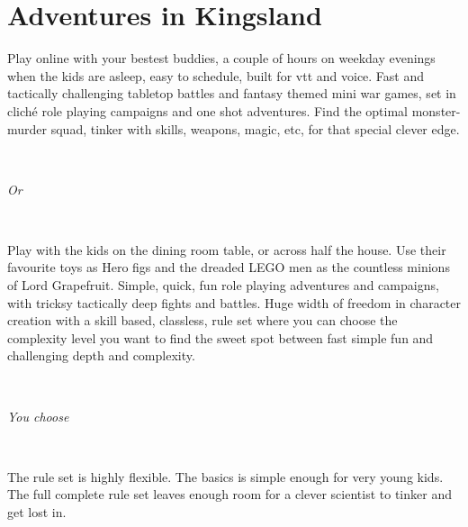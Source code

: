 \cleardoublepage
\pagestyle{fancy}
\flushbottom






\section*{Adventures in Kingsland}

\noindent
Play online with your bestest buddies, a couple of hours on weekday evenings when the kids are asleep, easy to schedule, built for vtt and voice.
Fast and tactically challenging tabletop battles and fantasy themed mini war games, set in cliché role playing campaigns and one shot adventures. 
Find the optimal monster-murder squad, tinker with skills, weapons, magic, etc, for that special clever edge.

\

\emph{Or}

\

\noindent
Play with the kids on the dining room table, or across half the house. Use their favourite toys as Hero figs and the dreaded \textsc{LEGO} men as the countless minions of Lord Grapefruit.
Simple, quick, fun role playing adventures and campaigns, with tricksy tactically deep fights and battles. 
Huge width of freedom in character creation with a skill based, classless, rule set where you can choose the complexity level you want to find the sweet spot between fast simple fun and challenging depth and complexity.

\

\emph{You choose}

\

\noindent
The rule set is highly flexible. The basics is simple enough for very young kids. The full complete rule set leaves enough room for a clever scientist to tinker and get lost in.


\vspace{2.0\baselineskip}


